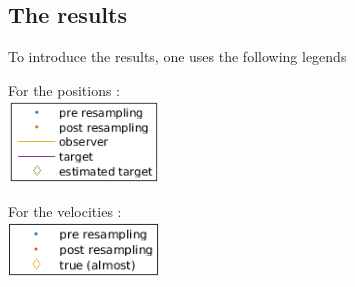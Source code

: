 \documentclass[english,DIV=13]{scrartcl}
\begin{document}
\subsection*{The results}
To introduce the results, one uses the following legends\\

	\begin{minipage}{.5\textwidth}
		\flushleft For the positions :\\
		 \center\includegraphics[width=4cm]{img/q4_legend1.png}
	\end{minipage}%
	\begin{minipage}{.3\textwidth}
		For the velocities :\\
		 \center\includegraphics[width=4cm]{img/q4_legend2.png}
	\end{minipage}
\end{document}
